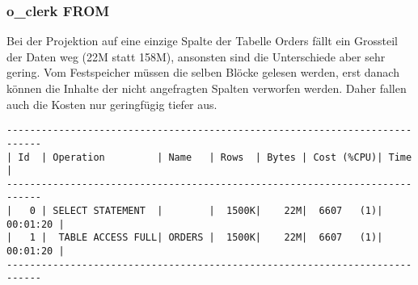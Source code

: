 \documentclass[11pt,a4paper,parskip=half]{scrartcl}
\begin{document}
\subsubsection{o\_clerk FROM}
\label{no-idx-pro-singlecol}
Bei der Projektion auf eine einzige Spalte der Tabelle Orders fällt ein Grossteil der Daten weg (22M statt 158M), ansonsten sind die Unterschiede aber sehr gering. Vom Festspeicher müssen die selben Blöcke gelesen werden, erst danach können die Inhalte der nicht angefragten Spalten verworfen werden. Daher fallen auch die Kosten nur geringfügig tiefer aus.
\begin{lstlisting}
----------------------------------------------------------------------------                                                                                                                                                                                                                                 
| Id  | Operation         | Name   | Rows  | Bytes | Cost (%CPU)| Time     |                                                                                                                                                                                                                                 
----------------------------------------------------------------------------                                                                                                                                                                                                                                 
|   0 | SELECT STATEMENT  |        |  1500K|    22M|  6607   (1)| 00:01:20 |                                                                                                                                                                                                                                 
|   1 |  TABLE ACCESS FULL| ORDERS |  1500K|    22M|  6607   (1)| 00:01:20 |                                                                                                                                                                                                                                 
----------------------------------------------------------------------------
\end{lstlisting}
\end{document}
